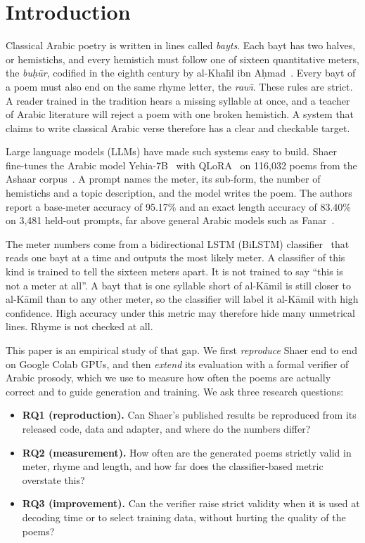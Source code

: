 \section{Introduction}
\label{sec:intro}

Classical Arabic poetry is written in lines called \emph{bayts}. Each bayt has two halves, or hemistichs, and every
hemistich must follow one of sixteen quantitative meters, the \emph{bu\d{h}\=ur}, codified in the eighth century by
al-Khal\={\i}l ibn A\d{h}mad~\cite{frolov2000classical}. Every bayt of a poem must also end on the same rhyme letter,
the \emph{raw\={\i}}. These rules are strict. A reader trained in the tradition hears a missing syllable at once, and
a teacher of Arabic literature will reject a poem with one broken hemistich. A system that claims to write classical
Arabic verse therefore has a clear and checkable target.

Large language models (LLMs) have made such systems easy to build. Shaer~\cite{abbas2026shaer} fine-tunes the Arabic
model Yehia-7B~\cite{yehia2025} with QLoRA~\cite{dettmers2023qlora} on 116,032 poems from the Ashaar
corpus~\cite{alyafeai2023ashaar}. A prompt names the meter, its sub-form, the number of hemistichs and a topic
description, and the model writes the poem. The authors report a base-meter accuracy of 95.17\% and an exact length
accuracy of 83.40\% on 3,481 held-out prompts, far above general Arabic models such as Fanar~\cite{fanar2026fanar2}.

The meter numbers come from a bidirectional LSTM (BiLSTM) classifier~\cite{abandah2022classifying} that reads one
bayt at a time and outputs the most likely meter. A classifier of this kind is trained to tell the sixteen meters
apart. It is not trained to say ``this is not a meter at all''. A bayt that is one syllable short of al-K\=amil is
still closer to al-K\=amil than to any other meter, so the classifier will label it al-K\=amil with high confidence.
High accuracy under this metric may therefore hide many unmetrical lines. Rhyme is not checked at all.

This paper is an empirical study of that gap. We first \emph{reproduce} Shaer end to end on Google Colab GPUs, and
then \emph{extend} its evaluation with a formal verifier of Arabic prosody, which we use to measure how often the
poems are actually correct and to guide generation and training. We ask three research questions:
\begin{itemize}
\item \textbf{RQ1 (reproduction).} Can Shaer's published results be reproduced from its released code, data and
adapter, and where do the numbers differ?
\item \textbf{RQ2 (measurement).} How often are the generated poems strictly valid in meter, rhyme and length, and how
far does the classifier-based metric overstate this?
\item \textbf{RQ3 (improvement).} Can the verifier raise strict validity when it is used at decoding time or to select
training data, without hurting the quality of the poems?
\end{itemize}

